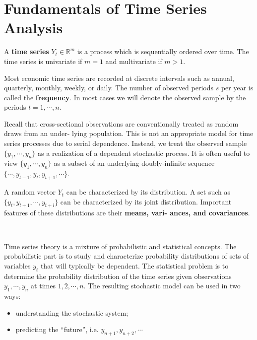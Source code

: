 \section{Fundamentals of Time Series Analysis}
\label{sec:fundamentals-of-time-series-analysis}

A \textbf{time series} $Y_t \in \mathbb{R}^m$ is a process which is sequentially ordered over time.
The time series is univariate if $m = 1$ and multivariate if $m > 1$.

Most economic time series are recorded at discrete intervals such as annual, quarterly, monthly,
weekly, or daily. The number of observed periods $s$ per year is called the \textbf{frequency}.
In most cases we will denote the observed sample by the periods $t = 1, \cdots, n$. 


Recall that cross-sectional observations are conventionally treated as random draws from an under-
lying population. This is not an appropriate model for time series processes due to serial dependence.
Instead, we treat the observed sample $\{y_1, \cdots, y_n\}$ as a realization of a dependent stochastic process. It is
often useful to view $\{y_1, \cdots, y_n\}$ as a subset of an underlying doubly-infinite sequence $\{\cdots, y_{t-1}, y_t, y_{t+1}, \cdots \}$.

A random vector $Y_t$ can be characterized by its distribution. A set such as $\{y_t, y_{t+1}, \cdots, y_{t+l} \}$ can be
characterized by its joint distribution. Important features of these distributions are their \textbf{means, vari-
ances, and covariances}.

\begin{remark}
    \

    Time series theory is a mixture of probabilistic and statistical concepts. 
    The probabilistic part is to study and characterize probability distributions 
    of sets of variables $y_t$ that will typically be dependent.
    The statistical problem is to determine the probability distribution of the time series
    given observations $y_1, \cdots, y_n$ at times $1,2, \cdots, n.$
    The resulting stochastic model can be used in two ways:
    \begin{itemize}
        \item understanding the stochastic system;
        \item predicting the ``future'', i.e. $y_{n+1}, y_{n+2}, \cdots$
    \end{itemize}
\end{remark}


